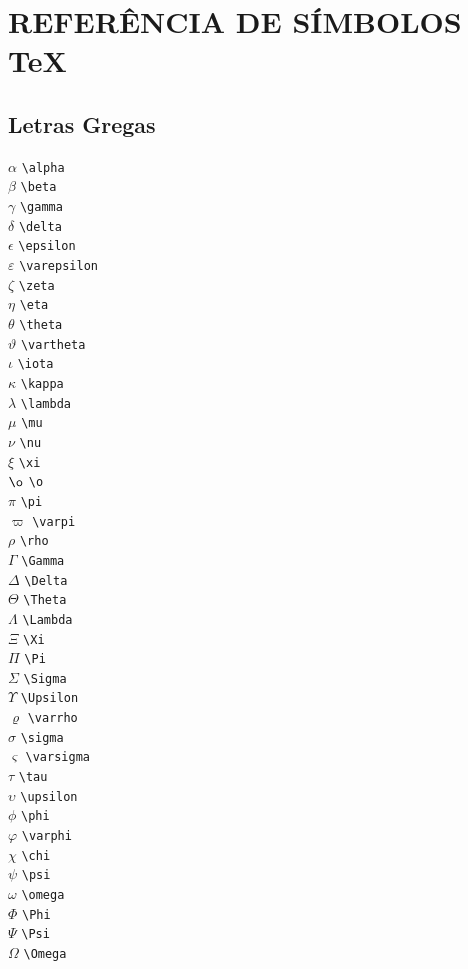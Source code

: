 \documentclass[xindy,draft]{fei}
\begin{document}
	\chapter{REFERÊNCIA DE SÍMBOLOS \TeX{}}

\section{Letras Gregas}
\begin{multicols}{3}
\noindent
\(\alpha\) \verb+\alpha+\\
\(\beta\) \verb+\beta+\\
\(\gamma\) \verb+\gamma+\\
\(\delta\) \verb+\delta+\\
\(\epsilon\) \verb+\epsilon+\\
\(\varepsilon\) \verb+\varepsilon+\\
\(\zeta\) \verb+\zeta+\\
\(\eta\) \verb+\eta+\\
\(\theta\) \verb+\theta+\\
\(\vartheta\) \verb+\vartheta+\\
\(\iota\) \verb+\iota+\\
\(\kappa\) \verb+\kappa+\\
\(\lambda\) \verb+\lambda+\\
\(\mu\) \verb+\mu+\\
\(\nu\) \verb+\nu+\\
\(\xi\) \verb+\xi+\\
\(\o\) \verb+\o+\\
\(\pi\) \verb+\pi+\\
\(\varpi\) \verb+\varpi+\\
\(\rho\) \verb+\rho+\\
\(\Gamma\) \verb+\Gamma+\\
\(\Delta\) \verb+\Delta+\\
\(\Theta\) \verb+\Theta+\\
\(\Lambda\) \verb+\Lambda+\\
\(\Xi\) \verb+\Xi+\\
\(\Pi\) \verb+\Pi+\\
\(\Sigma\) \verb+\Sigma+\\
\(\Upsilon\) \verb+\Upsilon+\\
\(\varrho\) \verb+\varrho+\\
\(\sigma\) \verb+\sigma+\\
\(\varsigma\) \verb+\varsigma+\\
\(\tau\) \verb+\tau+\\
\(\upsilon\) \verb+\upsilon+\\
\(\phi\) \verb+\phi+\\
\(\varphi\) \verb+\varphi+\\
\(\chi\) \verb+\chi+\\
\(\psi\) \verb+\psi+\\
\(\omega\) \verb+\omega+\\
\(\Phi\) \verb+\Phi+\\
\(\Psi\) \verb+\Psi+\\
\(\Omega\) \verb+\Omega+\\
\end{multicols}
\end{document}
